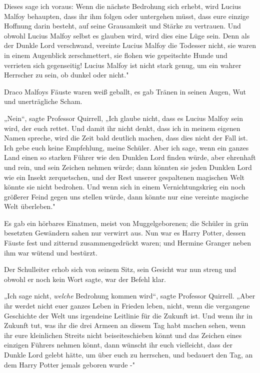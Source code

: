 {Dieses sage ich voraus: Wenn die nächste Bedrohung sich erhebt, wird Lucius Malfoy behaupten, dass ihr ihm folgen oder untergehen müsst, dass eure einzige Hoffnung darin besteht, auf seine Grausamkeit und Stärke zu vertrauen. Und obwohl Lucius Malfoy selbst es glauben wird, wird dies eine Lüge sein. Denn als der Dunkle Lord verschwand, vereinte Lucius Malfoy die Todesser nicht, sie waren in einem Augenblick zerschmettert, sie flohen wie gepeitschte Hunde und verrieten sich gegenseitig! Lucius Malfoy ist nicht stark genug, um ein wahrer Herrscher zu sein, ob dunkel oder nicht."

Draco Malfoys Fäuste waren weiß geballt, es gab Tränen in seinen Augen, Wut und unerträgliche Scham.

„Nein“, sagte Professor Quirrell, „Ich glaube nicht, dass es Lucius Malfoy sein wird, der euch rettet. Und damit ihr nicht denkt, dass ich in meinem eigenen Namen spreche, wird die Zeit bald deutlich machen, dass dies nicht der Fall ist. Ich gebe euch keine Empfehlung, meine Schüler. Aber ich sage, wenn ein ganzes Land einen so starken Führer wie den Dunklen Lord finden würde, aber ehrenhaft und rein, und sein Zeichen nehmen würde; dann könnten sie jeden Dunklen Lord wie ein Insekt zerquetschen, und der Rest unserer gespaltenen magischen Welt könnte sie nicht bedrohen. Und wenn sich in einem Vernichtungskrieg ein noch größerer Feind gegen uns stellen würde, dann könnte nur eine vereinte magische Welt überleben."

Es gab ein hörbares Einatmen, meist von Muggelgeborenen; die Schüler in grün besetzten Gewändern sahen nur verwirrt aus. Nun war es Harry Potter, dessen Fäuste fest und zitternd zusammengedrückt waren; und Hermine Granger neben ihm war wütend und bestürzt.

Der Schulleiter erhob sich von seinem Sitz, sein Gesicht war nun streng und obwohl er noch kein Wort sagte, war der Befehl klar.

„Ich sage nicht, \emph{welche} Bedrohung kommen wird“, sagte Professor Quirrell. „Aber ihr werdet nicht euer ganzes Leben in Frieden leben, nicht, wenn die vergangene Geschichte der Welt uns irgendeine Leitlinie für die Zukunft ist. Und wenn ihr in Zukunft tut, was ihr die drei Armeen an diesem Tag habt machen sehen, wenn ihr eure kleinlichen Streits nicht beiseiteschieben könnt und das Zeichen eines einzigen Führers nehmen könnt, dann wünscht ihr euch vielleicht, dass der Dunkle Lord gelebt hätte, um über euch zu herrschen, und bedauert den Tag, an dem Harry Potter jemals geboren wurde -"

}
